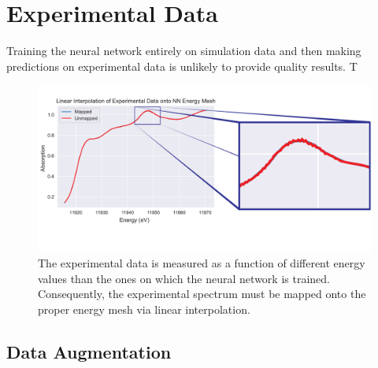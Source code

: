 \section{Experimental Data} \label{ch:results}
Training the neural network entirely on simulation data and then making predictions on experimental data is unlikely to provide quality results. T


\begin{figure}
    \centering
    \includegraphics[width=\linewidth]{Chapters/Figures/quality-of-interpolation-figure.pdf}
    \caption[Experimental Data Interpolation]{The experimental data is measured as a function of different energy values than the ones on which the neural network is trained. Consequently, the experimental spectrum must be mapped onto the proper energy mesh via linear interpolation.}
    \label{fig:interpolation}
\end{figure}

\subsection{Data Augmentation}

